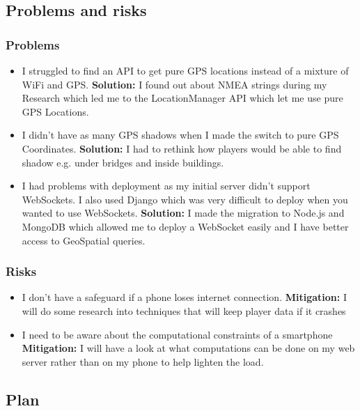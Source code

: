 \documentclass[11pt]{article}
\begin{document}
\subsection{Problems and risks}\label{problems-and-risks}

\subsubsection{Problems}\label{problems}
\begin{itemize}
    \tightlist
    \item I struggled to find an API to get pure GPS locations instead of a mixture of WiFi and GPS. \textbf{Solution:} I found out about NMEA
    strings during my Research which led me to the LocationManager API which let me use pure GPS Locations.

    \item I didn't have as many GPS shadows when I made the switch to pure GPS Coordinates. \textbf{Solution: } I had to rethink
    how players would be able to find shadow e.g. under bridges and inside buildings.

    \item I had problems with deployment as my initial server didn't support WebSockets. I also used Django which was very difficult to deploy
    when you wanted to use WebSockets. \textbf{Solution:} I made the migration to Node.js and MongoDB which allowed me to deploy a WebSocket easily
    and I have better access to GeoSpatial queries.
\end{itemize}

\subsubsection{Risks}\label{risks}


\begin{itemize}
    \tightlist
    \item I don't have a safeguard if a phone loses internet connection. \textbf{Mitigation:} I will do some research into techniques that will keep player data if it crashes
    \item I need to be aware about the computational constraints of a smartphone \textbf{Mitigation:} I will have a look at what computations can be done on my web server rather than on my phone to help lighten the load.
\end{itemize}

\subsection{Plan}\label{plan}
\end{document}
